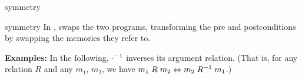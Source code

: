 \begin{tactic}{symmetry}
  \begin{tsyntax}{symmetry}
  In \prhl, swaps the two programs, transforming the pre and
  postconditions by swapping the memories they refer to.

  \textbf{Examples:} In the following, $\cdot^{-1}$ inverses its
  argument relation. (That is, for any relation $R$ and any $m_1$,
  $m_2$, we have
  $m_1 \mathrel{R} m_2\Leftrightarrow m_2 \mathrel{R^{-1}} m_1$.)
  \end{tsyntax}
\end{tactic}
